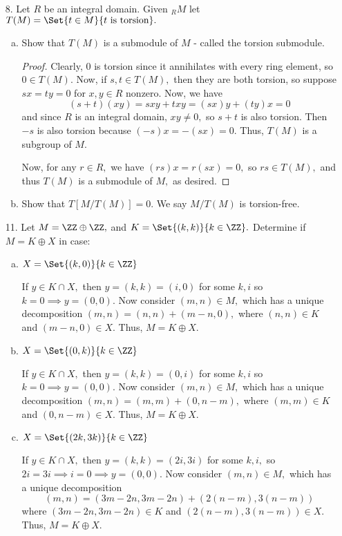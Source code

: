 \documentclass{article}
\begin{document}
\begin{itemize}
	\item[8.] Let $R$ be an integral domain. Given $_R M$ let $T(M)=\Set{t\in M}{t\text{ is torsion}}.$
		\begin{enumerate}[(a)]
			\item Show that $T(M)$ is a submodule of $M$ - called the torsion submodule.
				\begin{proof}
					Clearly, $0$ is torsion since it annihilates with every ring element, so $0\in T(M).$ Now, if $s, t\in T(M),$ then they are both torsion, so suppose $sx=ty=0$ for $x, y\in R$ nonzero. Now, we have
					\[(s+t)(xy) = sxy+txy=(sx)y+(ty)x = 0\]
					and since $R$ is an integral domain, $xy\neq 0,$ so $s+t$ is also torsion. Then $-s$ is also torsion because $(-s)x=-(sx)=0.$ Thus, $T(M)$ is a subgroup of $M.$

					Now, for any $r\in R,$ we have $(rs)x=r(sx)=0,$ so $rs\in T(M),$ and thus $T(M)$ is a submodule of $M,$ as desired.
				\end{proof}

			\item Show that $T[M/T(M)]=0.$ We say $M/T(M)$ is torsion-free.
				
		\end{enumerate}

	\item[11.] Let $M=\ZZ\oplus\ZZ,$ and $K=\Set{(k, k)}{k\in\ZZ}.$ Determine if $M=K\oplus X$ in case:
		\begin{enumerate}[(a)]
			\item $X=\Set{(k, 0)}{k\in\ZZ}$
				\begin{soln}
					If $y\in K\cap X,$ then $y=(k, k)=(i, 0)$ for some $k, i$ so $k=0\implies y=(0, 0).$ Now consider $(m, n)\in M,$ which has a unique decomposition $(m, n)=(n, n) + (m-n, 0),$ where $(n, n)\in K$ and $(m-n, 0)\in X.$ Thus, $M=K\oplus X.$
				\end{soln}

			\item $X=\Set{(0, k)}{k\in\ZZ}$
				\begin{soln}
					If $y\in K\cap X,$ then $y=(k, k)=(0, i)$ for some $k, i$ so $k=0\implies y=(0, 0).$ Now consider $(m, n)\in M,$ which has a unique decomposition $(m, n)=(m, m) + (0, n-m),$ where $(m, m)\in K$ and $(0, n-m)\in X.$ Thus, $M=K\oplus X.$
				\end{soln}

			\item $X=\Set{(2k, 3k)}{k\in\ZZ}$
				\begin{soln}
					If $y\in K\cap X,$ then $y=(k, k)=(2i, 3i)$ for some $k, i,$ so $2i=3i\implies i=0\implies y=(0, 0).$ Now consider $(m, n)\in M,$ which has a unique decomposition
					\[(m, n) = (3m-2n, 3m-2n)+(2(n-m), 3(n-m))\]
					where $(3m-2n, 3m-2n)\in K$ and $(2(n-m), 3(n-m))\in X.$ Thus, $M=K\oplus X.$
				\end{soln}


\end{enumerate}
\end{itemize}
\end{document}
